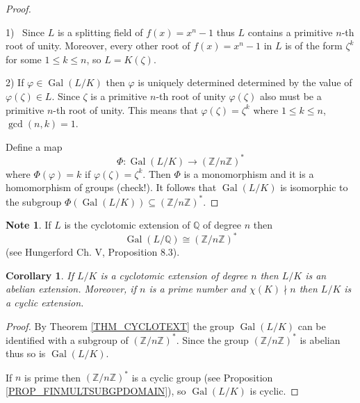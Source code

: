 \documentclass[12pt, letterpaper, oneside]{article}
\theoremstyle{plain}
\newtheorem{corollary}[theorem]{Corollary}
\theoremstyle{definition}
\newtheorem{note}[theorem]{Note}
\newcommand{\Z}{{\mathbb Z}}
\newcommand{\Q}{{\mathbb Q}}
\newcommand{\Gal}{\operatorname{Gal}}
\newcommand{\vs}{\vskip 5mm}
\begin{document}
\vs\vs\vs\vs

\begin{proof} \ 

1) \ Since   $L$ is a splitting field of $f(x) = x^{n}-1$ thus $L$ contains a primitive  $n$-th 
root of unity. Moreover, every other root  of $f(x)=x^{n}-1$ in $L$ is of the form $\zeta^{k}$
for some $1\leq k \leq n$, so $L = K(\zeta)$. 

\vs 

2) If $\varphi\in \Gal(L/K)$ then $\varphi$ is uniquely determined determined by the
value of $\varphi(\zeta)\in L$. Since $\zeta$ is a primitive $n$-th root of unity 
$\varphi(\zeta)$ also must be a primitive $n$-th root of unity. This means that 
$\varphi(\zeta) = \zeta^{k}$ where $1\leq k \leq n$,  $\gcd(n, k)=1$. 

Define a map 
$$\Phi\colon \Gal(L/K) \to (\Z/n\Z)^{\ast}$$
where $\Phi(\varphi) = k$ if $\varphi(\zeta) = \zeta^{k}$.  
Then  $\Phi$ is a monomorphism and it is a homomorphism of groups (check!). 
It follows that $\Gal(L/K)$ is isomorphic to the subgroup $\Phi(\Gal(L/K))\subseteq (\Z/n\Z)^{\ast}$.

\end{proof}

\vs\vs

\begin{note}
\label{NOTE_CYCLOTEXTQ}
If $L$ is the cyclotomic extension of $\Q$ of degree $n$ then 
$$\Gal(L/\Q) \cong (\Z/n\Z)^{\ast}$$
(see Hungerford Ch. V, Proposition 8.3). 
\end{note}

\vs\vs

\begin{corollary}
If $L/K$ is a cyclotomic extension of degree $n$ then $L/K$ is an abelian extension. 
Moreover, if $n$ is  a prime number and $\chi(K)\nmid n$ then $L/K$ is a cyclic extension. 
\end{corollary}

\vs

\begin{proof}
By Theorem \ref{THM_CYCLOTEXT} the group $\Gal(L/K)$ can be identified with a subgroup of 
$(\Z/n\Z)^{\ast}$. Since the group  $(\Z/n\Z)^{\ast}$ is abelian thus so is $\Gal(L/K)$. 

If $n$ is prime then $(\Z/n\Z)^{\ast}$ is a cyclic group 
(see Proposition \ref{PROP_FINMULTSUBGPDOMAIN}), so $\Gal(L/K)$ is cyclic.
\end{proof}


\vs\vs
\end{document}
